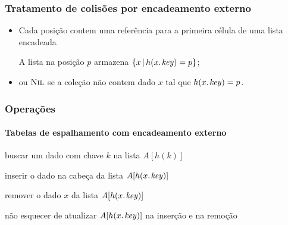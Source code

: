\documentclass{beamer}
\begin{document}
\begin{frame}

\frametitle{Tratamento de colisões por encadeamento externo}

\begin{itemize}

\item Cada posição contem uma referência para a primeira célula de uma lista
  encadeada

  A lista na posição $p$ armazena $\{ x \, | \, h(\attrib{x}{key}) = p \}$;

\item ou $\textnormal{\scshape Nil}$ se a coleção não contem dado $x$ tal que
  $h(\attrib{x}{key}) = p$.

\end{itemize}

\end{frame}

\begin{frame}

  \frametitle{Operações}
  \framesubtitle{Tabelas de espalhamento com encadeamento externo}

  \begin{codebox}
    \zi \Comment buscar um dado com chave $k$ na lista $A[ h( k )]$
  \end{codebox}

  \begin{codebox}
    \zi \Comment inserir o dado na cabeça da lista $A[ h( \attrib{x}{key} )] $
  \end{codebox}

  \begin{codebox}
    \zi \Comment remover o dado $x$ da lista $A[ h( \attrib{x}{key} )] $
  \end{codebox}

  \pause
  \alert{não esquecer de atualizar $A[h(\attrib{x}{key})]$ na inserção e na remoção}

\end{frame}
\end{document}
